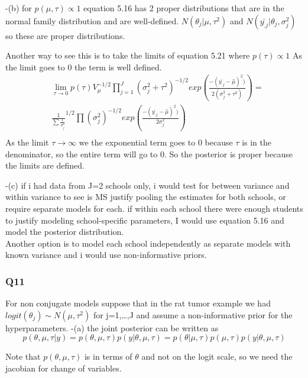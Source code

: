 \documentclass[
]{book}
\theoremstyle{definition}
\theoremstyle{definition}
\theoremstyle{definition}
\theoremstyle{definition}
\theoremstyle{remark}
\begin{document}
-(b) for \(p(\mu,\tau)\propto 1\) equation 5.16 has 2 proper distributions that are in the normal family distribution and are well-defined. \(N(\theta_j | \mu,\tau^2)\) and \(N(\bar{y_{.j}} | \theta_j, \sigma_j^2)\) so these are proper distributions.

Another way to see this is to take the limits of equation 5.21 where \(p(\tau)\propto 1\) As the limit goes to 0 the term is well defined.
\[
\begin{aligned}
& \lim_{\tau \to 0} p(\tau)V_{\mu}^{-1/2}\prod_{j=1}^J(\sigma_j^2+\tau^2)^{-1/2}exp(\frac{-(\bar{y_{.j}}-\hat{\mu})^2)}{2(\sigma_j^2+\tau^2)}) = \\
& \frac{1}{\sum \frac{1}{\sigma_j^2}}^{1/2}\prod (\sigma_j^2)^{-1/2}exp(\frac{-(\bar{y_{.j}}-\hat{\mu})^2)}{2\sigma_j^2}) \\
\end{aligned}
\]
As the limit \(\tau \to \infty\) we the exponential term goes to 0 because \(\tau\) is in the denominator, so the entire term will go to 0. So the posterior is proper because the limits are defined.

-(c) if i had data from J=2 schools only, i would test for between variance and within variance to see is MS justify pooling the estimates for both schools, or require separate models for each. if within each school there were enough students to justify modeling school-specific parameters, I would use equation 5.16 and model the posterior distribution.\\
Another option is to model each school independently as separate models with known variance and i would use non-informative priors.

\hypertarget{q11}{%
\subsubsection*{Q11}\label{q11}}

For non conjugate models suppose that in the rat tumor example we had \(logit(\theta_j)\sim N(\mu,\tau^2)\) for j=1,\ldots,J and assume a non-informative prior for the hyperparameters.
-(a) the joint posterior can be written as
\begin{equation}
   p(\theta,\mu,\tau|y ) = p(\theta,\mu,\tau)p(y|\theta,\mu,\tau) = p(\theta|\mu,\tau)p(\mu,\tau)p(y|\theta,\mu,\tau)
   \end{equation}

Note that \(p(\theta,\mu,\tau)\) is in terms of \(\theta\) and not on the logit scale, so we need the jacobian for change of variables.
\end{document}
